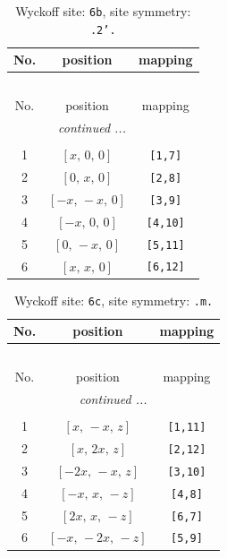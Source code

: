 \documentclass[fleqn,8pt]{jsarticle}
\begin{document}
\begin{longtable}{ccc}
\caption{Wyckoff site: {\tt 6b}, site symmetry: {\tt .2'.}}
 \\
 \hline \hline
No. & position & mapping \\ \hline \endfirsthead

\multicolumn{2}{l}{\tablename\ \thetable{}} \\
 \hline \hline
No. & position & mapping \\ \hline \endhead

 \hline \hline
\multicolumn{2}{r}{\footnotesize\it continued ...} \\ \endfoot

 \hline \hline
\multicolumn{2}{r}{} \\ \endlastfoot

1 & $\left[ x,\, 0,\, 0 \right]$ & {\tt [1,7]} \\ \hline
2 & $\left[ 0,\, x,\, 0 \right]$ & {\tt [2,8]} \\ \hline
3 & $\left[ - x,\, - x,\, 0 \right]$ & {\tt [3,9]} \\ \hline
4 & $\left[ - x,\, 0,\, 0 \right]$ & {\tt [4,10]} \\ \hline
5 & $\left[ 0,\, - x,\, 0 \right]$ & {\tt [5,11]} \\ \hline
6 & $\left[ x,\, x,\, 0 \right]$ & {\tt [6,12]} \\
\end{longtable}
\renewcommand{\arraystretch}{1.2}
\begin{longtable}{ccc}
\caption{Wyckoff site: {\tt 6c}, site symmetry: {\tt .m.}}
 \\
 \hline \hline
No. & position & mapping \\ \hline \endfirsthead

\multicolumn{2}{l}{\tablename\ \thetable{}} \\
 \hline \hline
No. & position & mapping \\ \hline \endhead

 \hline \hline
\multicolumn{2}{r}{\footnotesize\it continued ...} \\ \endfoot

 \hline \hline
\multicolumn{2}{r}{} \\ \endlastfoot

1 & $\left[ x,\, - x,\, z \right]$ & {\tt [1,11]} \\ \hline
2 & $\left[ x,\, 2 x,\, z \right]$ & {\tt [2,12]} \\ \hline
3 & $\left[ - 2 x,\, - x,\, z \right]$ & {\tt [3,10]} \\ \hline
4 & $\left[ - x,\, x,\, - z \right]$ & {\tt [4,8]} \\ \hline
5 & $\left[ 2 x,\, x,\, - z \right]$ & {\tt [6,7]} \\ \hline
6 & $\left[ - x,\, - 2 x,\, - z \right]$ & {\tt [5,9]} \\
\end{longtable}
\end{document}
